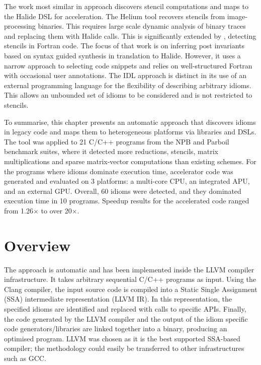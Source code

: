     The work most similar in approach discovers stencil computations and maps to
    the Halide DSL for acceleration.
    The Helium tool \citep{Mendis2015Helium} recovers stencils from
    image-processing binaries.
    This requires large scale dynamic analysis of binary traces and replacing
    them with Halide calls. 
    This is significantly extended by \citet{Kamil2016Verified}, detecting
    stencils in Fortran code.
    The focus of that work is on inferring post invariants based on syntax
    guided synthesis in translation to Halide.
    However, it uses a narrow approach to selecting code snippets and relies on
    well-structured Fortran with occasional user annotations.
    The IDL approach is distinct in its use of an external programming language
    for the flexibility of describing arbitrary idioms.
    This allows an unbounded set of idioms to be considered and is not
    restricted to stencils. 

    To summarise, this chapter presents an automatic approach that discovers
    idioms in legacy code and maps them to heterogeneous platforms via libraries
    and DSLs.
    The tool was applied to 21 C/C++ programs from the NPB and Parboil benchmark
    suites, where it detected more reductions, stencils, matrix multiplications
    and sparse matrix-vector computations than existing schemes.
    For the programs where idioms dominate execution time, accelerator code
    was generated and evaluated on 3 platforms: a multi-core CPU, an integrated
    APU, and an external GPU.
    Overall, 60 idioms were detected, and they dominated execution time in
    10 programs.
    Speedup results for the accelerated code ranged from 1.26$\times$ to over
    20$\times$.

\section{Overview}

    The approach is automatic and has been implemented inside the LLVM compiler
    infrastructure.
    It takes arbitrary sequential C/C++ programs as input.
    Using the Clang compiler, the input source code is compiled into a Static
    Single Assignment (SSA) intermediate representation (LLVM IR).
    In this representation, the specified idioms are identified and replaced
    with calls to specific APIs.
    Finally, the code generated by the LLVM compiler and the output of the idiom
    specific code generators/libraries are linked together into a binary,
    producing an optimised program.
    LLVM was chosen as it is the best supported SSA-based compiler;
    the methodology could easily be transferred to other infrastructures such as
    GCC.

